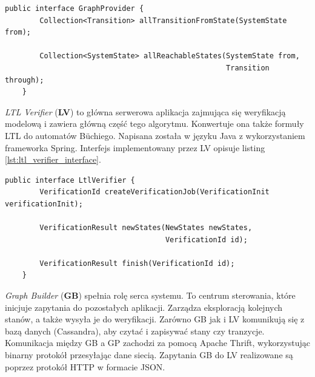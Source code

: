 \begin{lstlisting}[caption={Interfejs implementowany przez GP.},captionpos=b,label={lst:graph_provider_interface}]
    public interface GraphProvider {
        Collection<Transition> allTransitionFromState(SystemState from);

        Collection<SystemState> allReachableStates(SystemState from,
                                                   Transition through);
    }
\end{lstlisting}

\textit{LTL Verifier} (\textbf{LV}) to główna serwerowa aplikacja zajmująca się weryfikacją modelową i zawiera główną część tego algorytmu.
Konwertuje ona także formuły LTL do automatów Büchiego.
Napisana została w języku Java z wykorzystaniem frameworka Spring.
Interfejs implementowany przez LV opisuje listing \ref{lst:ltl_verifier_interface}.

\begin{lstlisting}[caption={Interfejs implementowany przez LV.},captionpos=b,label={lst:ltl_verifier_interface}]
    public interface LtlVerifier {
        VerificationId createVerificationJob(VerificationInit verificationInit);

        VerificationResult newStates(NewStates newStates,
                                     VerificationId id);

        VerificationResult finish(VerificationId id);
    }
\end{lstlisting}

\textit{Graph Builder} (\textbf{GB}) spełnia rolę serca systemu.
To centrum sterowania, które inicjuje zapytania do pozostałych aplikacji.
Zarządza eksploracją kolejnych stanów, a także wysyła je do weryfikacji.
Zarówno GB jak i LV komunikują się z bazą danych (Cassandra), aby czytać i zapisywać stany czy tranzycje.
Komunikacja między GB a GP zachodzi za pomocą Apache Thrift, wykorzystując binarny protokół przesyłając dane siecią.
Zapytania GB do LV realizowane są poprzez protokół HTTP w formacie JSON.

